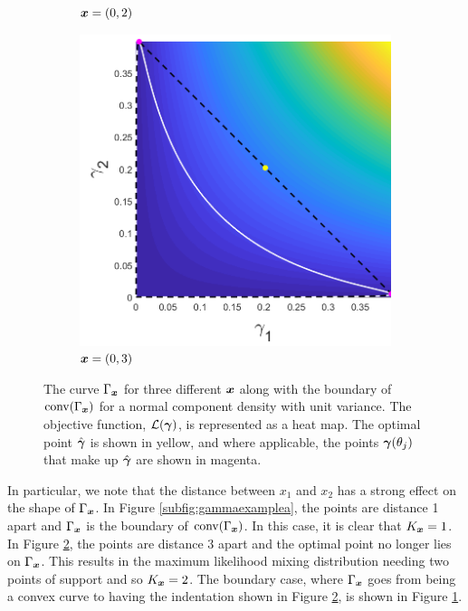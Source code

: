 \begin{figure}[ht]
\begin{subfigure}[t]{0.32\textwidth}
				\caption{${\bm{{x}}} = (0,2)$} \label{subfig:gammaexampleb}
			\end{subfigure}
			\begin{subfigure}[t]{0.32\textwidth}
				\centering
				\includegraphics[width = \textwidth]{Sigma1x1_0-x2_3}
				\caption{${\bm{{x}}} = (0,3)$} \label{subfig:gammaexamplec}
			\end{subfigure}
			\caption[The curve $\Gamma_\vect{x}$ for three different $\vect{x}$ along with the boundary of $\conv(\Gamma_\vect{x})$ for a normal component density with unit variance.]{The curve $\Gamma_\vect{x}$ for three different $\vect{x}$ along with the boundary of $\conv(\Gamma_\vect{x})$ for a normal component density with unit variance. The objective function, $\mathcal{L}({\bm{{\gamma}}})$, is represented as a heat map. The optimal point $\hat{{\bm{{\gamma}}}}$ is shown in yellow, and where applicable, the points ${\bm{{\gamma}}}(\theta_j)$ that make up $\hat{{\bm{{\gamma}}}}$ are shown in magenta.}
			\label{fig:Gammaexample}
		\end{figure}
%
		In particular, we note that the distance between $x_1$ and $x_2$ has a strong effect on the shape of $\Gamma_\vect{x}$. In Figure \ref{subfig:gammaexamplea}, the points are distance 1 apart and $\Gamma_\vect{x}$ is the boundary of $\conv(\Gamma_\vect{x})$. In this case, it is clear that $K_{\bm{{x}}} = 1$. In Figure \ref{subfig:gammaexamplec}, the points are distance 3 apart and the optimal point no longer lies on $\Gamma_\vect{x}$. This results in the maximum likelihood mixing distribution needing two points of support and so $K_{\bm{{x}}} = 2$. The boundary case, where $\Gamma_\vect{x}$ goes from being a convex curve to having the indentation shown in Figure \ref{subfig:gammaexamplec}, is shown in Figure \ref{subfig:gammaexampleb}.

